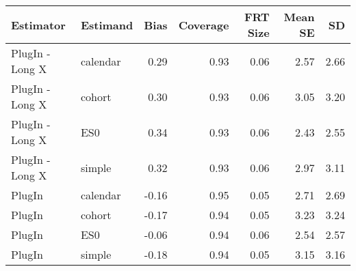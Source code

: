\captionsetup[table]{labelformat=empty,skip=1pt}
\begin{longtable}{llrrrrr}
\toprule
Estimator & Estimand & Bias & Coverage & FRT Size & Mean SE & SD \\ 
\midrule
PlugIn - Long X & calendar & 0.29 & 0.93 & 0.06 & 2.57 & 2.66 \\ 
PlugIn - Long X & cohort & 0.30 & 0.93 & 0.06 & 3.05 & 3.20 \\ 
PlugIn - Long X & ES0 & 0.34 & 0.93 & 0.06 & 2.43 & 2.55 \\ 
PlugIn - Long X & simple & 0.32 & 0.93 & 0.06 & 2.97 & 3.11 \\ 
PlugIn & calendar & -0.16 & 0.95 & 0.05 & 2.71 & 2.69 \\ 
PlugIn & cohort & -0.17 & 0.94 & 0.05 & 3.23 & 3.24 \\ 
PlugIn & ES0 & -0.06 & 0.94 & 0.06 & 2.54 & 2.57 \\ 
PlugIn & simple & -0.18 & 0.94 & 0.05 & 3.15 & 3.16 \\ 
 \bottomrule
\end{longtable}

